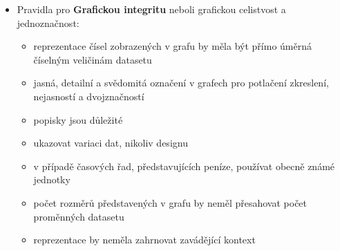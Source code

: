 \documentclass[12pt,]{article}
\providecommand{\tightlist}{%
  \setlength{\itemsep}{0pt}\setlength{\parskip}{0pt}}
\begin{document}
\newpage

\begin{itemize}
\tightlist
\item
  Pravidla pro \textbf{Grafickou integritu} neboli grafickou celistvost
  a jednoznačnost:

  \begin{itemize}
  \tightlist
  \item
    reprezentace čísel zobrazených v grafu by měla být přímo úměrná
    číselným veličinám datasetu
  \item
    jasná, detailní a svědomitá označení v grafech pro potlačení
    zkreslení, nejasností a dvojznačností
  \item
    popisky jsou důležité
  \item
    ukazovat variaci dat, nikoliv designu
  \item
    v případě časových řad, představujících peníze, používat obecně
    známé jednotky
  \item
    počet rozměrů představených v grafu by neměl přesahovat počet
    proměnných datasetu
  \item
    reprezentace by neměla zahrnovat zavádějící kontext
  \end{itemize}
\end{itemize}
\end{document}

